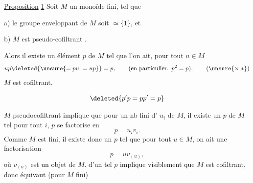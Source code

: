 
\uline{Proposition} \uline{1} Soit $M$ un monoïde fini, tel que

a) le groupe enveloppant de $M$ soit $\simeq\{1\}$, et

b) $M$ est pseudo-cofiltrant .

Alors il existe un  élément $p$ de $M$ tel
que l'on ait, pour tout $u\in M$
\[
up\deleted{\unsure{=pu|=up}}=p,\qquad(\text{en particulier. }p^2=p),\tag*{$(\unsure{\times|*})$}
\]
  $M$ est  cofiltrant.

\[
\deleted{p'p=pp'=p}
\]

 $M$ pseudocofiltrant 
implique que pour un nb fini d'
$u_i$ de $M$, il existe un  $p$ de $M$ tel
  pour tout $i$, $p$ se factorise en
\[
p=u_i v_i.
\]
Comme $M$ est fini, il existe donc un $p$
tel que pour tout $u\in M$, on ait une
factorisation
\[
p=uv_{(u)},\tag*{$(\times\times)$}
\]
où $v_{(u)}$ est un objet de $M$.  
d'un tel $p$ implique visiblement que $M$
est cofiltrant, donc équivaut (pour $M$ fini)

